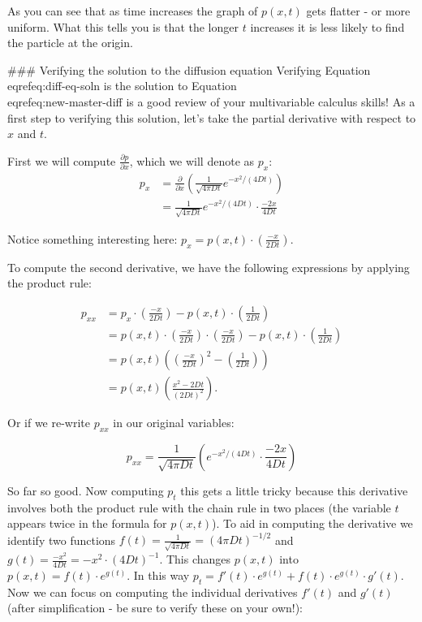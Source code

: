 \documentclass[
]{book}
\theoremstyle{definition}
\theoremstyle{definition}
\theoremstyle{definition}
\theoremstyle{remark}
\begin{document}
 As you can see that as time increases the graph of $p(x,t)$ gets flatter - or more uniform. What this tells you is that the longer $t$ increases it is less likely to find the particle at the origin.

### Verifying the solution to the diffusion equation
Verifying Equation \\eqref{eq:diff-eq-soln} is the solution to Equation \\eqref{eq:new-master-diff} is a good review of your multivariable calculus skills!  As a first step to verifying this solution, let's take the partial derivative with respect to $x$ and $t$.

First we will compute $\displaystyle \frac{\partial p}{\partial x}$, which we will denote as $p_{x}$:
\begin{align*}
p_{x} &= \frac{\partial }{\partial x} \left( \frac{1}{\sqrt{4 \pi Dt} } e^{-x^{2}/(4 D t)} \right) \\
&= \frac{1}{\sqrt{4 \pi Dt} } e^{-x^{2}/(4 D t)} \cdot \frac{-2x}{4Dt}
\end{align*}

Notice something interesting here:  $\displaystyle p_{x} = p(x,t) \cdot \left( \frac{-x}{2Dt} \right)$.

To compute the second derivative, we have the following expressions by applying the product rule:

\begin{align*}
p_{xx} &= p_{x} \cdot \left( \frac{-x}{2Dt} \right) - p(x,t) \cdot \left( \frac{1}{2Dt} \right) \\
&= p(x,t) \cdot \left( \frac{-x}{2Dt} \right) \cdot \left( \frac{-x}{2Dt} \right)- p(x,t) \cdot \left( \frac{1}{2Dt} \right) \\
&= p(x,t) \left( \left( \frac{-x}{2Dt} \right)^{2} - \left( \frac{1}{2Dt} \right) \right) \\
&= p(x,t) \left( \frac{x^{2}-2Dt}{(2Dt)^{2}}\right).
\end{align*}

Or if we re-write $p_{xx}$ in our original variables:

\begin{equation*}
p_{xx} = \frac{1}{\sqrt{4 \pi Dt} } \left(  e^{-x^{2}/(4 D t)} \cdot \frac{-2x}{4Dt} \right)
\end{equation*}

So far so good.  Now computing $p_{t}$ this gets a little tricky because this derivative involves both the product rule with the chain rule in two places (the variable $t$ appears twice in the formula for $p(x,t)$).  To aid in computing the derivative we identify two functions $\displaystyle f(t) = \frac{1}{\sqrt{4 \pi Dt} } = (4 \pi D t)^{-1/2}$ and $\displaystyle g(t)= \frac{-x^{2}}{4Dt} = -x^{2} \cdot (4Dt)^{-1}$.  This changes $p(x,t)$ into $p(x,t) = f(t) \cdot e^{g(t)}$.  In this way $p_{t} = f'(t) \cdot e^{g(t)} + f(t) \cdot e^{g(t)} \cdot g'(t)$.  Now we can focus on computing the individual derivatives $f'(t)$ and $g'(t)$ (after simplification - be sure to verify these on your own!):
\end{document}
